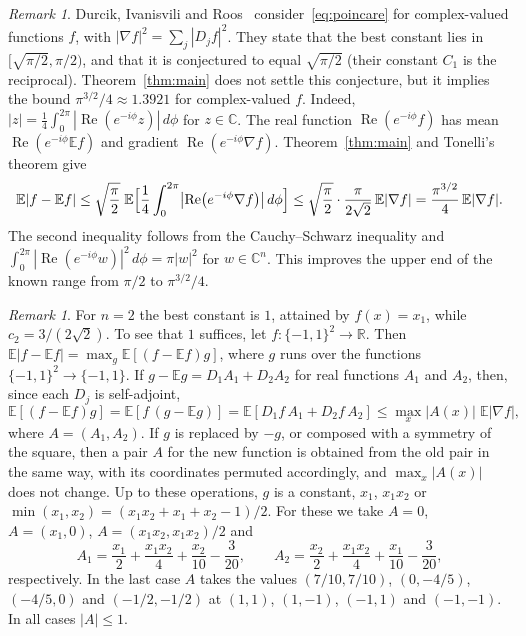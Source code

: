 \documentclass[11pt]{amsart}
\theoremstyle{remark}
\newtheorem{remark}[theorem]{Remark}
\numberwithin{equation}{section}
\newcommand{\R}{\mathbb{R}}
\newcommand{\E}{\mathbb{E}}
\begin{document}
\begin{remark}\label{con:rem:complex}
Durcik, Ivanisvili and Roos~\cite[Section~1.5]{DIR26} consider~\eqref{eq:poincare} for complex-valued functions $f$, with $|\nabla f|^2=\sum_j|D_jf|^2$. They state that the best constant lies in $[\sqrt{\pi/2},\pi/2)$, and that it is conjectured to equal $\sqrt{\pi/2}$ (their constant $C_1$ is the reciprocal). Theorem~\ref{thm:main} does not settle this conjecture, but it implies the bound $\pi^{3/2}/4\approx1.3921$ for complex-valued $f$. Indeed, $|z|=\frac14\int_0^{2\pi}|\operatorname{Re}(e^{-i\phi}z)|\,d\phi$ for $z\in\mathbb C$. The real function $\operatorname{Re}(e^{-i\phi}f)$ has mean $\operatorname{Re}(e^{-i\phi}\E f)$ and gradient $\operatorname{Re}(e^{-i\phi}\nabla f)$. Theorem~\ref{thm:main} and Tonelli's theorem give
\[
\E|f-\E f|\le\sqrt{\frac\pi2}\;\E\Bigl[\frac14\int_0^{2\pi}\bigl|\operatorname{Re}\bigl(e^{-i\phi}\nabla f\bigr)\bigr|\,d\phi\Bigr]\le\sqrt{\frac\pi2}\cdot\frac\pi{2\sqrt2}\,\E|\nabla f|=\frac{\pi^{3/2}}4\,\E|\nabla f|.
\]
The second inequality follows from the Cauchy--Schwarz inequality and $\int_0^{2\pi}|\operatorname{Re}(e^{-i\phi}w)|^2\,d\phi=\pi|w|^2$ for $w\in\mathbb C^n$. This improves the upper end of the known range from $\pi/2$ to $\pi^{3/2}/4$.
\end{remark}

\begin{remark}\label{con:rem:dim2}
For $n=2$ the best constant is $1$, attained by $f(x)=x_1$, while $c_2=3/(2\sqrt2)$. To see that $1$ suffices, let $f\colon\{-1,1\}^2\to\R$. Then $\E|f-\E f|=\max_g\E[(f-\E f)g]$, where $g$ runs over the functions $\{-1,1\}^2\to\{-1,1\}$. If $g-\E g=D_1A_1+D_2A_2$ for real functions $A_1$ and $A_2$, then, since each $D_j$ is self-adjoint,
\[
\E[(f-\E f)g]=\E[f\,(g-\E g)]=\E[D_1f\,A_1+D_2f\,A_2]\le\max_x|A(x)|\;\E|\nabla f|,
\]
where $A=(A_1,A_2)$. If $g$ is replaced by $-g$, or composed with a symmetry of the square, then a pair $A$ for the new function is obtained from the old pair in the same way, with its coordinates permuted accordingly, and $\max_x|A(x)|$ does not change. Up to these operations, $g$ is a constant, $x_1$, $x_1x_2$ or $\min(x_1,x_2)=(x_1x_2+x_1+x_2-1)/2$. For these we take $A=0$, $A=(x_1,0)$, $A=(x_1x_2,x_1x_2)/2$ and
\[
A_1=\frac{x_1}2+\frac{x_1x_2}4+\frac{x_2}{10}-\frac3{20},\qquad A_2=\frac{x_2}2+\frac{x_1x_2}4+\frac{x_1}{10}-\frac3{20},
\]
respectively. In the last case $A$ takes the values $(7/10,7/10)$, $(0,-4/5)$, $(-4/5,0)$ and $(-1/2,-1/2)$ at $(1,1)$, $(1,-1)$, $(-1,1)$ and $(-1,-1)$. In all cases $|A|\le1$.
\end{remark}
\end{document}
